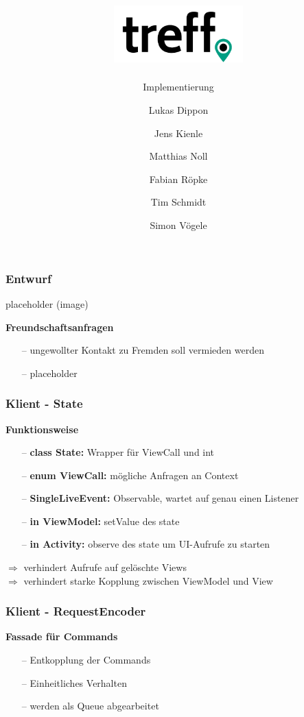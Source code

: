 \documentclass[aspectratio=1610]{beamer}
\title{\includegraphics[width = 50mm]{images/logo_crop.png}}
\subtitle{\huge Implementierung}
\author{Lukas Dippon
	\and Jens Kienle
	\and Matthias Noll
	\and Fabian Röpke
	\and Tim Schmidt
	\and Simon Vögele}
\begin{document}
	\begin{frame}[plain]
	\maketitle
	\end{frame}

	\begin{frame}[plain]
		\frametitle{Entwurf}

		\begin{minipage}{0.5\textwidth}
		placeholder (image)
		\end{minipage}%
		\begin{minipage}{0.5\textwidth}
		\textbf{Freundschaftsanfragen}
		\begin{itemize}
			\setlength\itemsep{0.3em}
			\item[--] ungewollter Kontakt zu Fremden soll vermieden werden
			\item[--] placeholder
		\end{itemize}
		\end{minipage}

	\end{frame}

	\begin{frame}[plain]
		\frametitle{Klient - State}
		\textbf{Funktionsweise}
		\begin{itemize}
			\setlength\itemsep{0.3em}
			\item[--] \textbf{class State:} Wrapper für ViewCall und int
			\item[--] \textbf{enum ViewCall:} mögliche Anfragen an Context
			\item[--] \textbf{SingleLiveEvent:} Observable, wartet auf 
			genau einen Listener
			\item[--] \textbf{in ViewModel:} setValue des state
			\item[--] \textbf{in Activity:} observe des state um UI-Aufrufe 
			zu starten
		\end{itemize}
	$\Rightarrow$ verhindert Aufrufe auf gelöschte Views \\
	$\Rightarrow$ verhindert starke Kopplung zwischen ViewModel und View
	\end{frame}

	\begin{frame}[plain]
	\frametitle{Klient - RequestEncoder}
	\textbf{Fassade für Commands}
	\begin{itemize}
		\setlength\itemsep{0.3em}
		\item[--] Entkopplung der Commands
		\item[--] Einheitliches Verhalten
		\item[--] werden als Queue abgearbeitet
 	\end{itemize}
	\end{frame}
\end{document}
